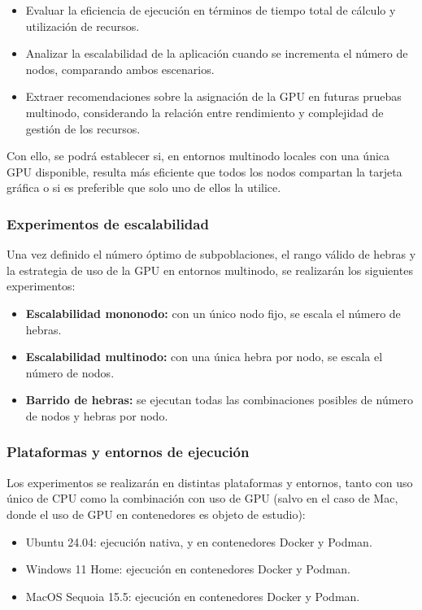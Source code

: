 \begin{itemize}
    \item Evaluar la eficiencia de ejecución en términos de tiempo total de cálculo y utilización de recursos.
    \item Analizar la escalabilidad de la aplicación cuando se incrementa el número de nodos, comparando ambos escenarios.
    \item Extraer recomendaciones sobre la asignación de la GPU en futuras pruebas multinodo, considerando la relación entre rendimiento y complejidad de gestión de los recursos.
\end{itemize}

Con ello, se podrá establecer si, en entornos multinodo locales con una única GPU disponible, resulta más eficiente que todos los nodos compartan la tarjeta gráfica o si es preferible que solo uno de ellos la utilice.

\subsubsection{Experimentos de escalabilidad}

Una vez definido el número óptimo de subpoblaciones, el rango válido de hebras y la estrategia de uso de la GPU en entornos multinodo, se realizarán los siguientes experimentos:

\begin{itemize}
    \item \textbf{Escalabilidad mononodo:} con un único nodo fijo, se escala el número de hebras.
    \item \textbf{Escalabilidad multinodo:} con una única hebra por nodo, se escala el número de nodos.
    \item \textbf{Barrido de hebras:} se ejecutan todas las combinaciones posibles de número de nodos y hebras por nodo.
\end{itemize}

\subsubsection{Plataformas y entornos de ejecución}

Los experimentos se realizarán en distintas plataformas y entornos, tanto con uso único de CPU como la combinación con uso de GPU (salvo en el caso de Mac, donde el uso de GPU en contenedores es objeto de estudio):

\begin{itemize}
    \item Ubuntu 24.04: ejecución nativa, y en contenedores Docker y Podman.
    \item Windows 11 Home: ejecución en contenedores Docker y Podman.
    \item MacOS Sequoia 15.5: ejecución en contenedores Docker y Podman.
\end{itemize}

